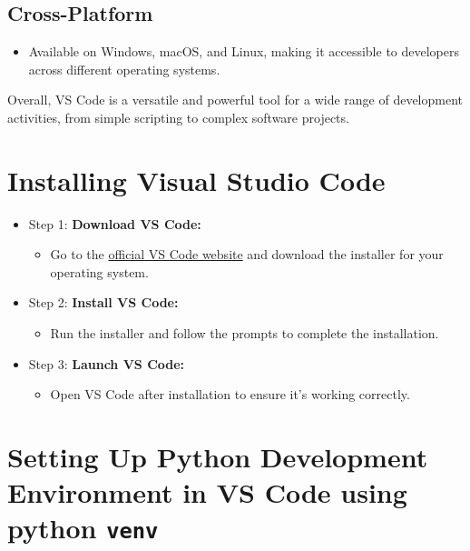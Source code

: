\documentclass[
  letterpaper,
  DIV=11,
  numbers=noendperiod]{scrreprt}
\providecommand{\tightlist}{%
  \setlength{\itemsep}{0pt}\setlength{\parskip}{0pt}}\usepackage{longtable,booktabs,array}
\begin{document}
\hypertarget{cross-platform}{%
\subsection{Cross-Platform}\label{cross-platform}}

\begin{itemize}
\tightlist
\item
  Available on Windows, macOS, and Linux, making it accessible to
  developers across different operating systems.
\end{itemize}

Overall, VS Code is a versatile and powerful tool for a wide range of
development activities, from simple scripting to complex software
projects.

\hypertarget{installing-visual-studio-code}{%
\section{Installing Visual Studio
Code}\label{installing-visual-studio-code}}

\begin{itemize}
\tightlist
\item
  Step 1: \textbf{Download VS Code:}

  \begin{itemize}
  \tightlist
  \item
    Go to the \href{https://code.visualstudio.com/}{official VS Code
    website} and download the installer for your operating system.
  \end{itemize}
\item
  Step 2: \textbf{Install VS Code:}

  \begin{itemize}
  \tightlist
  \item
    Run the installer and follow the prompts to complete the
    installation.
  \end{itemize}
\item
  Step 3: \textbf{Launch VS Code:}

  \begin{itemize}
  \tightlist
  \item
    Open VS Code after installation to ensure it's working correctly.
  \end{itemize}
\end{itemize}

\hypertarget{setting-up-python-development-environment-in-vs-code-using-python-venv}{%
\section{\texorpdfstring{Setting Up Python Development Environment in VS
Code using python
\texttt{venv}}{Setting Up Python Development Environment in VS Code using python venv}}\label{setting-up-python-development-environment-in-vs-code-using-python-venv}}
\end{document}
